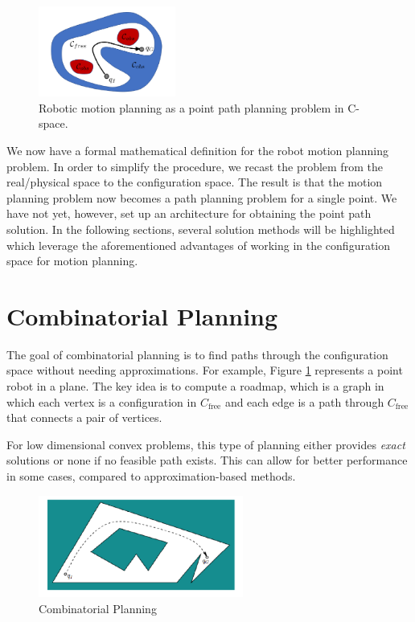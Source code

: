 \documentclass[twoside]{article}
\begin{document}
\begin{figure}[ht!]
\begin{center}
\includegraphics[width=0.4\textwidth]{fig15_3.PNG}
\caption{Robotic motion planning as a point path planning problem in C-space.}
\end{center}
\end{figure}

We now have a formal mathematical definition for the robot motion planning problem. In order to simplify the procedure, we recast the problem from the real/physical space to the configuration space. The result is that the motion planning problem now becomes a path planning problem for a single point. We have not yet, however, set up an architecture for obtaining the point path solution. In the following sections, several solution methods will be highlighted which leverage the aforementioned advantages of working in the configuration space for motion planning.

\section{Combinatorial Planning} \label{Combinatorial Planning}
The goal of combinatorial planning is to find paths through the configuration space without needing approximations. For example, Figure \ref{fig:15_4} represents a point robot in a plane. The key idea is to compute a roadmap, which is a graph in which each vertex is a configuration in $C_\text{free}$ and each edge is a path through $C_\text{free}$ that connects a pair of vertices.

For low dimensional convex problems, this type of planning either provides \textit{exact} solutions or none if no feasible path exists. This can allow for better performance in some cases, compared to approximation-based methods.

\begin{figure}[H]
\begin{center}
\includegraphics[width=0.6\textwidth]{fig15_4.PNG}
\caption{Combinatorial Planning}
\label{fig:15_4}
\end{center}
\end{figure}
\end{document}
